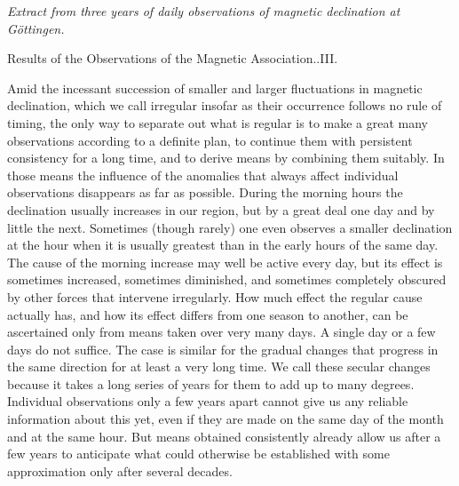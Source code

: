 \begin{center}\large\textit{Extract from three years of daily observations of magnetic declination at Göttingen.}\end{center}
\begin{center}\small Results of the Observations of the Magnetic Association..\quad III.\end{center}

Amid the incessant succession of smaller and larger fluctuations in magnetic declination, which we call irregular insofar as their occurrence follows no rule of timing, the only way to separate out what is regular is to make a great many observations according to a definite plan, to continue them with persistent consistency for a long time, and to derive means by combining them suitably. In those means the influence of the anomalies that always affect individual observations disappears as far as possible. During the morning hours the declination usually increases in our region, but by a great deal one day and by little the next. Sometimes (though rarely) one even observes a smaller declination at the hour when it is usually greatest than in the early hours of the same day. The cause of the morning increase may well be active every day, but its effect is sometimes increased, sometimes diminished, and sometimes completely obscured by other forces that intervene irregularly. How much effect the regular cause actually has, and how its effect differs from one season to another, can be
ascertained only from means taken over very many days. A single day or a few days do not suffice. The case is similar for the gradual changes that progress in the same direction for at least a very long time. We call these secular changes because it takes a long series of years for them to add up to many degrees. Individual observations only a few years apart cannot give us any reliable information about this yet, even if they are made on the same day of the month and at the same hour. But means obtained consistently already allow us after a few years to anticipate what could otherwise be established with some approximation only after several decades.

